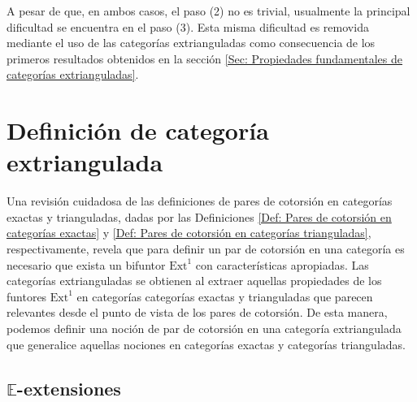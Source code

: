 \documentclass[tesis]{subfiles}
\begin{document}
\noindent A pesar de que, en ambos casos, el paso (2) no es trivial, usualmente la principal dificultad se encuentra en el paso (3). Esta misma dificultad es removida mediante el uso de las categorías extrianguladas como consecuencia de los primeros resultados obtenidos en la sección \ref{Sec: Propiedades fundamentales de categorías extrianguladas}.

\section{Definición de categoría extriangulada} \label{Sec: Definición de categoría extriangulada}


Una revisión cuidadosa de las definiciones de pares de cotorsión en categorías exactas y trianguladas, dadas por las Definiciones \ref{Def: Pares de cotorsión en categorías exactas} y \ref{Def: Pares de cotorsión en categorías trianguladas}, respectivamente, revela que para definir un par de cotorsión en una categoría es necesario que exista un bifuntor $\text{Ext}_{}^{1}$ con características apropiadas. Las categorías extrianguladas se obtienen al extraer aquellas propiedades de los funtores $\text{Ext}_{}^{1}$ en categorías categorías exactas y trianguladas que parecen relevantes desde el punto de vista de los pares de cotorsión. De esta manera, podemos definir una noción de par de cotorsión en una categoría extriangulada que generalice aquellas nociones en categorías exactas y categorías trianguladas.

\subsection*{$\mathbb{E}$-extensiones} \label{Ssec: E-extensiones}
\end{document}
